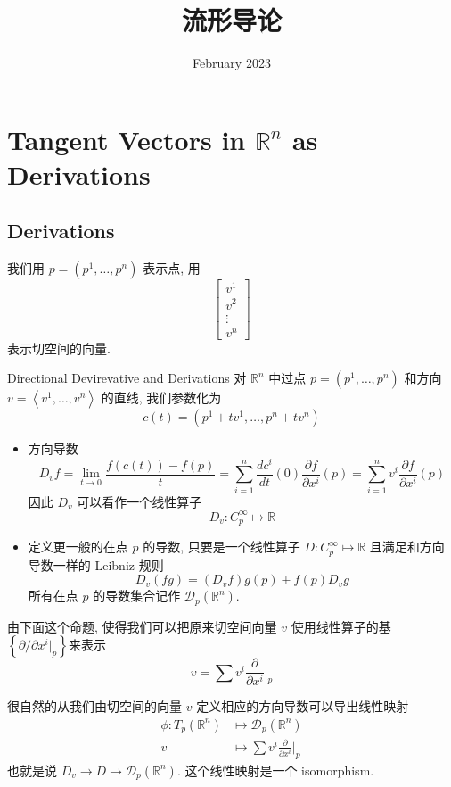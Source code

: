 \documentclass[a4paper, 12pt]{article}
\title{流形导论}
\date{February 2023}
\newcommand{\R}{\mathbb{R}}
\newcommand{\z}{\left}
\newcommand{\y}{\right}
\begin{document}
\maketitle

\section{Tangent Vectors in $\R^n$ as Derivations}
\subsection{Derivations}
我们用 $p = (p^1, \dots, p^n)$ 表示点, 用
$$
\begin{bmatrix} v^1 \\ v^2 \\ \vdots \\ v^n \end{bmatrix}
$$
表示切空间的向量.

\begin{Definition}{Directional Devirevative and Derivations}{}
对 $\R^n$ 中过点 $p = (p^1, \dots, p^n)$ 和方向 $v = \z< v^1, \dots, v^n\y>$ 的直线, 我们参数化为
$$
c(t) = (p^1 + tv^1, \dots, p^n + tv^n)
$$
\begin{itemize}
\item 
方向导数
$$
D_v f = \lim_{t \to 0} \frac{f(c(t)) - f(p)}{t} = \sum_{i=1}^{n} \frac{dc^i}{dt}(0)\frac{\partial f}{\partial x^i}(p) = \sum_{i=1}^{n}v^i \frac{\partial f}{\partial x^i}(p)
$$
因此 $D_v$ 可以看作一个线性算子
$$
D_v \colon C^{\infty}_p \mapsto \R 
$$ 
\item
定义更一般的在点 $p$ 的导数, 只要是一个线性算子 $D\colon C^{\infty}_p \mapsto \R$ 且满足和方向导数一样的 Leibniz 规则
$$
D_v(fg) = (D_vf)g(p) + f(p)D_vg 
$$
所有在点 $p$ 的导数集合记作 $\mathcal{D}_p(\R^n)$.
\end{itemize}
\end{Definition}

由下面这个命题, 使得我们可以把原来切空间向量 $v$ 使用线性算子的基 $ \z\{ \partial / \partial x^i|_p \y\}$来表示
\begin{equation}
    v = \sum v^i \frac{\partial}{\partial x^i} \Big|_p
\end{equation}

\begin{Proposition}{}{}
很自然的从我们由切空间的向量 $v$ 定义相应的方向导数可以导出线性映射
\begin{equation}
\begin{aligned}
\phi \colon T_p(\R^n) &\mapsto \mathcal{D}_p(\R^n) \\ 
v &\mapsto \sum{v^i}\frac{\partial}{\partial x^i} \Big|_p
\end{aligned}  
\end{equation}
也就是说 $D_v \to D \to \mathcal{D}_p(\R^n)$.
这个线性映射是一个 isomorphism.
\end{Proposition}
\end{document}
